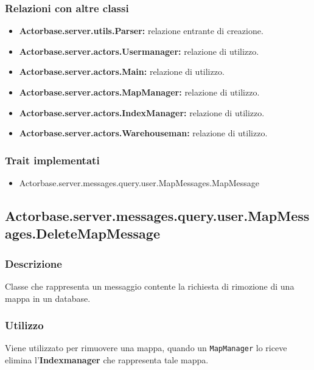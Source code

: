 \documentclass[a4paper]{article}
\begin{document}
			\subsubsection{Relazioni con altre classi}
				\begin{itemize}
					\item \textbf{Actorbase.server.utils.Parser:} relazione entrante di creazione.
					\item \textbf{Actorbase.server.actors.Usermanager:} relazione di utilizzo.
					\item \textbf{Actorbase.server.actors.Main:} relazione di utilizzo.
					\item \textbf{Actorbase.server.actors.MapManager:} relazione di utilizzo.
					\item \textbf{Actorbase.server.actors.IndexManager:} relazione di utilizzo.
					\item \textbf{Actorbase.server.actors.Warehouseman:} relazione di utilizzo.
				\end{itemize}
			\subsubsection{Trait implementati}
				\begin{itemize}
					\item Actorbase.server.messages.query.user.MapMessages.MapMessage
				\end{itemize}
				
		\subsection{Actorbase.server.messages.query.user.MapMessages.DeleteMapMessage}
			\subsubsection{Descrizione}
				Classe che rappresenta un messaggio contente la richiesta di rimozione di una mappa in un database.
				
			\subsubsection{Utilizzo}
				Viene utilizzato per rimuovere una mappa, quando un \texttt{MapManager} lo riceve elimina l'\textbf{Indexmanager} che rappresenta tale mappa.
				
\end{document}
